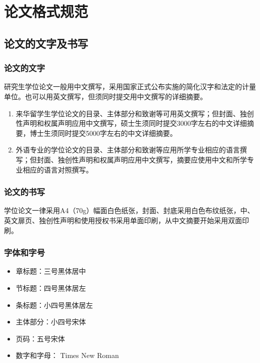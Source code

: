 
\chapter{论文格式规范}

\section{论文的文字及书写}

\subsection{论文的文字}

研究生学位论文一般用中文撰写，采用国家正式公布实施的简化汉字和法定的计量单位。也可以用英文撰写，但须同时提交用中文撰写的详细摘要。
\begin{enumerate}
  \item 来华留学生学位论文的目录、主体部分和致谢等可用英文撰写；但封面、独创性声明和权属声明应用中文撰写，硕士生须同时提交3000字左右的中文详细摘要，博士生须同时提交5000字左右的中文详细摘要。
  \item 外语专业的学位论文的目录、主体部分和致谢等应用所学专业相应的语言撰写；但封面、独创性声明和权属声明应用中文撰写，摘要应使用中文和所学专业相应的语言对照撰写。
\end{enumerate}

\subsection{论文的书写}

学位论文一律采用A4（70g）幅面白色纸张，封面、封底采用白色布纹纸张，中、英文扉页、独创性声明和使用授权书采用单面印刷，从中文摘要开始采用双面印刷。

\subsection{字体和字号}

\begin{itemize}
\item 章标题：三号黑体居中
\item 节标题：四号黑体居左
\item 条标题：小四号黑体居左
\item 主体部分：小四号宋体
\item 页码：五号宋体
\item 数字和字母： Times New Roman
\end{itemize}

